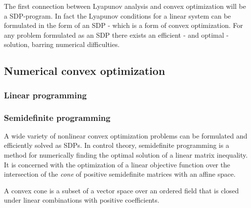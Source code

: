 The first connection between Lyapunov analysis and convex optimization will be a
\ac{SDP}-program. In fact the Lyapunov conditions for a linear system can be
formulated in the form of an \ac{SDP} - which is a form of convex optimization.
For any problem formulated as an \ac{SDP} there exists an efficient - and
optimal - solution, barring numerical difficulties.

\subsection{Numerical convex optimization}

\subsubsection{Linear programming}

\subsubsection{Semidefinite programming}

A wide variety of nonlinear convex optimization problems can be formulated and
efficiently solved as \ac{SDP}s. In control theory, semidefinite programming is
a method for numerically finding the optimal solution of a linear matrix
inequality. It is concerned with the optimization of a linear objective function
over the intersection of the \textit{cone} of positive semidefinite matrices
with an affine space.

A convex cone is a subset of a vector space over an ordered field that is closed
under linear combinations with positive coefficients.

